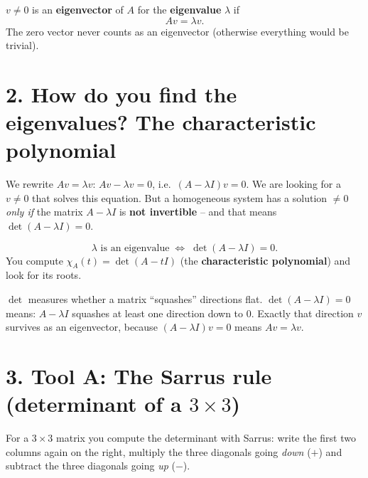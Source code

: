 \documentclass[a4paper,12pt]{article}
\begin{document}
\begin{merkbox}
$v \neq 0$ is an \textbf{eigenvector} of $A$ for the \textbf{eigenvalue} $\lambda$ if
\[
A v = \lambda v.
\]
The zero vector never counts as an eigenvector (otherwise everything would be trivial).
\end{merkbox}

\section*{2. How do you find the eigenvalues? The characteristic polynomial}

We rewrite $Av = \lambda v$: $Av - \lambda v = 0$, i.e.\ $(A - \lambda I)v = 0$. We are looking for a $v \neq 0$ that solves this equation. But a homogeneous system has a solution $\neq 0$ \emph{only if} the matrix $A - \lambda I$ is \textbf{not invertible} -- and that means $\det(A - \lambda I) = 0$.

\begin{merkbox}[title={The key}]
\[
\lambda \text{ is an eigenvalue} \;\Longleftrightarrow\; \det(A - \lambda I) = 0.
\]
You compute $\chi_A(t) = \det(A - tI)$ (the \textbf{characteristic polynomial}) and look for its roots.
\end{merkbox}

\begin{analogie}
$\det$ measures whether a matrix ``squashes'' directions flat. $\det(A - \lambda I) = 0$ means: $A - \lambda I$ squashes at least one direction down to $0$. Exactly that direction $v$ survives as an eigenvector, because $(A - \lambda I)v = 0$ means $Av = \lambda v$.
\end{analogie}

\section*{3. Tool A: The Sarrus rule (determinant of a $3\times3$)}

For a $3\times3$ matrix you compute the determinant with Sarrus: write the first two columns again on the right, multiply the three diagonals going \emph{down} ($+$) and subtract the three diagonals going \emph{up} ($-$).

\begin{center}
\end{center}
\end{document}
